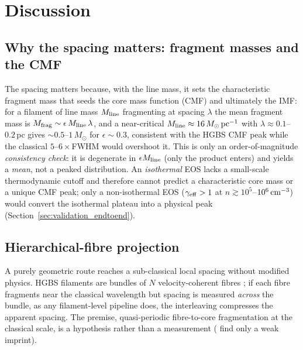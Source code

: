 \documentclass[usenatbib,twoside,twocolumn]{mnras}
\begin{document}
\section{Discussion}
\label{sec:discussion}

\subsection{Why the spacing matters: fragment masses and the CMF}
\label{sec:cmf}
The spacing matters because, with the line mass, it sets the characteristic fragment mass that seeds the core mass function (CMF) and ultimately the IMF: for a filament of line mass $M_{\rm line}$ fragmenting at spacing $\lambda$ the mean fragment mass is $M_{\rm frag}\sim\epsilon\,M_{\rm line}\,\lambda$, and a near-critical $M_{\rm line}\approx16\,M_\odot\,{\rm pc^{-1}}$ with $\lambda\approx0.1$--$0.2$\,pc gives $\sim0.5$--$1\,M_\odot$ for $\epsilon\sim0.3$, consistent with the HGBS CMF peak while the classical $5$--$6\times$FWHM would overshoot it. This is only an order-of-magnitude \emph{consistency check}: it is degenerate in $\epsilon M_{\rm line}$ (only the product enters) and yields a \emph{mean}, not a peaked distribution. An \emph{isothermal} EOS lacks a small-scale thermodynamic cutoff and therefore cannot predict a characteristic core mass or a unique CMF peak; only a non-isothermal EOS ($\gamma_{\rm eff}>1$ at $n\gtrsim10^{5}$--$10^{6}\,{\rm cm^{-3}}$) would convert the isothermal plateau into a physical peak (Section~\ref{sec:validation_endtoend}).

\subsection{Hierarchical-fibre projection}
\label{sec:fibre_projection}

A purely geometric route reaches a sub-classical local spacing without modified physics. HGBS filaments are bundles of $N$ velocity-coherent fibres \citep{Hacar2013,Hacar2018,Yang2024}; if each fibre fragments near the classical wavelength but spacing is measured \emph{across} the bundle, as any filament-level pipeline does, the interleaving compresses the apparent spacing. The premise, quasi-periodic fibre-to-core fragmentation at the classical scale, is a hypothesis rather than a measurement (\citealt{Yang2024} find only a weak imprint).
\end{document}
